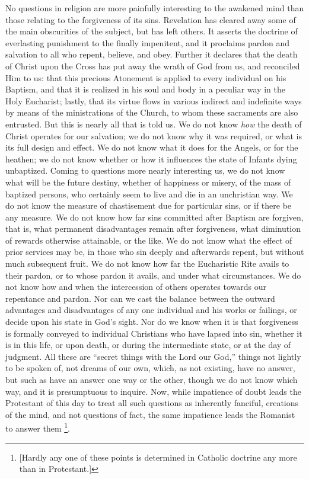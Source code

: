 No questions in religion are more painfully interesting to the
awakened mind than those relating to the forgiveness of its sins.
Revelation has cleared away some of the main obscurities of the
subject, but has left others. It asserts the doctrine of everlasting
punishment to the finally impenitent, and it proclaims pardon and
salvation to all who repent, believe, and obey. Further it declares
that the death of Christ upon the Cross has put away the wrath of God
from us, and reconciled Him to us: that this precious Atonement is
applied to every individual on his Baptism, and that it is realized in
his soul and body in a peculiar way in the Holy Eucharist;
lastly, that its virtue flows in various indirect and indefinite ways
by means of the ministrations of the Church, to whom these sacraments
are also entrusted. But this is nearly all that is told us. We do not
know \emph{how} the death of Christ operates for our salvation; we do
not know why it was required, or what is its full design and effect.
We do not know what it does for the Angels, or for the heathen; we do
not know whether or how it influences the state of Infants dying
unbaptized. Coming to questions more nearly interesting us, we do not
know what will be the future destiny, whether of happiness or misery,
of the mass of baptized persons, who certainly seem to live and die in
an unchristian way. We do not know the measure of chastisement due for
particular sins, or if there be any measure. We do not know how far
sins committed after Baptism are forgiven, that is, what permanent
disadvantages remain after forgiveness, what diminution of rewards
otherwise attainable, or the like. We do not know what the effect of
prior services may be, in those who sin deeply and afterwards repent,
but without much subsequent fruit. We do not know how far the
Eucharistic Rite avails to their pardon, or to whose pardon it avails,
and under what circumstances. We do not know how and when the
intercession of others operates towards our repentance and pardon. Nor
can we cast the balance between the outward advantages and
disadvantages of any one individual and his works or failings, or
decide upon his state in God's sight. Nor do we know when it is that
forgiveness is formally conveyed to individual Christians who have
lapsed into sin, whether it is in this life, or upon death, or during
the intermediate state, or at the day of judgment. All these are
``secret things with the Lord our God,'' things not lightly to
be spoken of, not dreams of our own, which, as not existing, have no
answer, but such as have an answer one way or the other, though we do
not know which way, and it is presumptuous to inquire. Now, while
impatience of doubt leads the Protestant of this day to treat all such
questions as inherently fanciful, creations of the mind, and not
questions of fact, the same impatience leads the Romanist to answer
them \footnote{[Hardly any one of these points is
determined in Catholic doctrine any more than in Protestant.]}.

